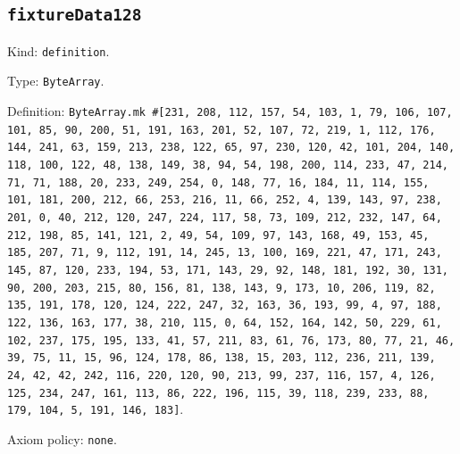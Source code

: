 \documentclass[11pt]{article}
\begin{document}
\subsection*{\texttt{fixtureData128}}
\noindent Kind: \texttt{definition}.\par
\noindent Type: \texttt{ByteArray}.\par
\noindent Definition: \texttt{ByteArray.mk \#[231, 208, 112, 157, 54, 103, 1, 79, 106, 107, 101, 85, 90, 200, 51, 191, 163, 201, 52, 107, 72, 219, 1, 112, 176, 144, 241, 63, 159, 213, 238, 122, 65, 97, 230, 120, 42, 101, 204, 140, 118, 100, 122, 48, 138, 149, 38, 94, 54, 198, 200, 114, 233, 47, 214, 71, 71, 188, 20, 233, 249, 254, 0, 148, 77, 16, 184, 11, 114, 155, 101, 181, 200, 212, 66, 253, 216, 11, 66, 252, 4, 139, 143, 97, 238, 201, 0, 40, 212, 120, 247, 224, 117, 58, 73, 109, 212, 232, 147, 64, 212, 198, 85, 141, 121, 2, 49, 54, 109, 97, 143, 168, 49, 153, 45, 185, 207, 71, 9, 112, 191, 14, 245, 13, 100, 169, 221, 47, 171, 243, 145, 87, 120, 233, 194, 53, 171, 143, 29, 92, 148, 181, 192, 30, 131, 90, 200, 203, 215, 80, 156, 81, 138, 143, 9, 173, 10, 206, 119, 82, 135, 191, 178, 120, 124, 222, 247, 32, 163, 36, 193, 99, 4, 97, 188, 122, 136, 163, 177, 38, 210, 115, 0, 64, 152, 164, 142, 50, 229, 61, 102, 237, 175, 195, 133, 41, 57, 211, 83, 61, 76, 173, 80, 77, 21, 46, 39, 75, 11, 15, 96, 124, 178, 86, 138, 15, 203, 112, 236, 211, 139, 24, 42, 42, 242, 116, 220, 120, 90, 213, 99, 237, 116, 157, 4, 126, 125, 234, 247, 161, 113, 86, 222, 196, 115, 39, 118, 239, 233, 88, 179, 104, 5, 191, 146, 183]}.\par
\noindent Axiom policy: \texttt{none}.\par
\end{document}
